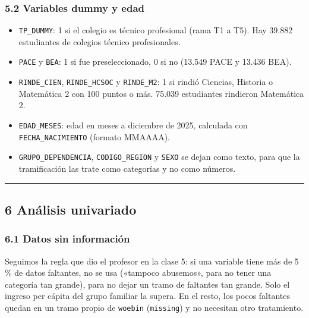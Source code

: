 \documentclass[11pt]{article}
\begin{document}
\subsubsection*{5.2 \; Variables dummy y edad}

\begin{itemize}[leftmargin=1.5em, itemsep=0.3em]
  \item \texttt{TP\_DUMMY}: 1 si el colegio es técnico profesional (rama
        T1 a T5). Hay 39.882 estudiantes de colegios técnico profesionales.
  \item \texttt{PACE} y \texttt{BEA}: 1 si fue preseleccionado, 0 si no
        (13.549 PACE y 13.436 BEA).
  \item \texttt{RINDE\_CIEN}, \texttt{RINDE\_HCSOC} y \texttt{RINDE\_M2}:
        1 si rindió Ciencias, Historia o Matemática 2 con 100 puntos o
        más. 75.039 estudiantes rindieron Matemática 2.
  \item \texttt{EDAD\_MESES}: edad en meses a diciembre de 2025, calculada
        con \texttt{FECHA\_NACIMIENTO} (formato MMAAAA).
  \item \texttt{GRUPO\_DEPENDENCIA}, \texttt{CODIGO\_REGION} y
        \texttt{SEXO} se dejan como texto, para que la tramificación las
        trate como categorías y no como números.
\end{itemize}

\medskip\hrule\medskip

\subsection*{6 \; Análisis univariado}

\subsubsection*{6.1 \; Datos sin información}

Seguimos la regla que dio el profesor en la clase 5: si una variable tiene
más de 5\,\% de datos faltantes, no se usa («tampoco abusemos», para no
tener una categoría tan grande), para no dejar un tramo de faltantes tan grande.
Solo el ingreso per cápita del grupo familiar la supera. En el resto, los
pocos faltantes quedan en un tramo propio de \texttt{woebin}
(\texttt{missing}) y no necesitan otro tratamiento.
\end{document}
